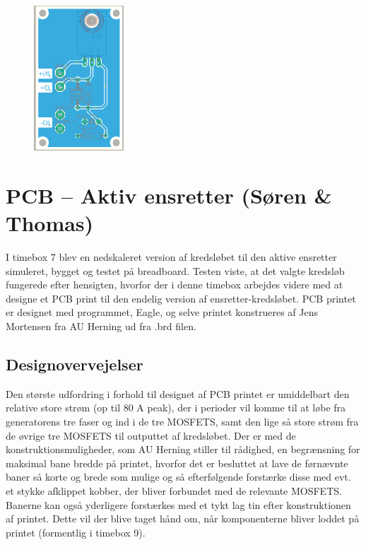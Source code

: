 \begin{figure}[h]
  \centering
  \includegraphics[width=0.3\textwidth]{bil9.png}
  \caption{}
  \label{fig:bil66}
\end{figure}
\clearpage
\section{PCB – Aktiv ensretter (Søren \& Thomas)}
\label{sec:pcb--aktiv}

I timebox 7 blev en nedskaleret version af kredsløbet til den aktive ensretter simuleret, bygget og testet på breadboard. Testen viste, at det valgte kredsløb fungerede efter hensigten, hvorfor der i denne timebox arbejdes videre med at designe et PCB print til den endelig version af ensretter-kredsløbet. PCB printet er designet med programmet, Eagle, og selve printet konstrueres af Jens Mortensen fra AU Herning ud fra .brd filen.

\subsection{Designovervejelser}
\label{sec:designovervejelser}

Den største udfordring i forhold til designet af PCB printet er umiddelbart den relative store strøm (op til 80 A peak), der i perioder vil komme til at løbe fra generatorens tre faser og ind i de tre MOSFETS, samt den lige så store strøm fra de øvrige tre MOSFETS til outputtet af kredsløbet. Der er med de konstruktionsmuligheder, som AU Herning stiller til rådighed, en begrænsning for maksimal bane bredde på printet, hvorfor det er besluttet at lave de førnævnte baner så korte og brede som mulige og så efterfølgende forstærke disse med evt. et stykke afklippet kobber, der bliver forbundet med de relevante MOSFETS. Banerne kan også yderligere forstærkes med et tykt lag tin efter konstruktionen af printet. Dette vil der blive taget hånd om, når komponenterne bliver loddet på printet (formentlig i timebox 9).

